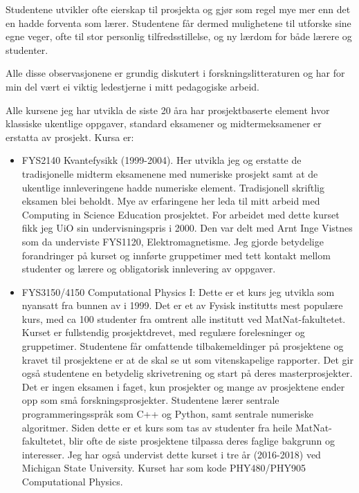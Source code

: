 \documentclass[aps,floatfix,preprint]{revtex4-1}
\begin{document}
Studentene utvikler ofte eierskap til prosjekta og gjør som regel mye mer enn det en hadde forventa som lærer. Studentene får dermed mulighetene til utforske sine egne veger, ofte til stor personlig tilfredsstillelse, og ny lærdom for både lærere og studenter. 

Alle disse observasjonene er grundig diskutert i forskningslitteraturen og har for min del vært ei viktig ledestjerne i mitt pedagogiske arbeid.

Alle kursene jeg har utvikla de siste 20 åra har prosjektbaserte element hvor klassiske ukentlige oppgaver, standard eksamener og midtermeksamener er erstatta av prosjekt.  Kursa er:


\begin{itemize}
  
\item FYS2140 Kvantefysikk (1999-2004). Her utvikla jeg og erstatte de tradisjonelle midterm eksamenene med numeriske prosjekt samt at de ukentlige innleveringene hadde numeriske element. Tradisjonell skriftlig eksamen blei beholdt. Mye av erfaringene her leda til mitt arbeid med Computing in Science Education prosjektet. For arbeidet med dette kurset fikk jeg UiO sin undervisningspris i 2000. Den var delt med Arnt Inge Vistnes som da underviste FYS1120, Elektromagnetisme. Jeg gjorde betydelige forandringer på kurset og innførte gruppetimer med tett kontakt mellom studenter og lærere og obligatorisk innlevering av oppgaver.
  
\item FYS3150/4150 Computational Physics I: Dette er et kurs jeg utvikla som nyansatt fra bunnen av i 1999. Det er et av Fysisk institutts mest populære kurs, med ca 100 studenter fra omtrent alle institutt ved MatNat-fakultetet. Kurset er fullstendig prosjektdrevet, med regulære forelesninger og gruppetimer. Studentene får omfattende tilbakemeldinger på prosjektene og kravet til prosjektene er at de skal se ut som vitenskapelige rapporter. Det gir også studentene en betydelig skrivetrening og start på deres masterprosjekter.  Det er ingen eksamen i faget, kun prosjekter og mange av prosjektene ender opp som små forskningsprosjekter. Studentene lærer sentrale programmeringsspråk som C++ og Python, samt sentrale numeriske algoritmer. Siden dette er et kurs som tas av studenter fra heile MatNat-fakultetet, blir ofte de siste prosjektene tilpassa deres faglige bakgrunn og interesser. Jeg har også undervist dette kurset i tre år (2016-2018) ved Michigan State University.  Kurset har som kode PHY480/PHY905 Computational Physics.


\end{itemize}
\end{document}
